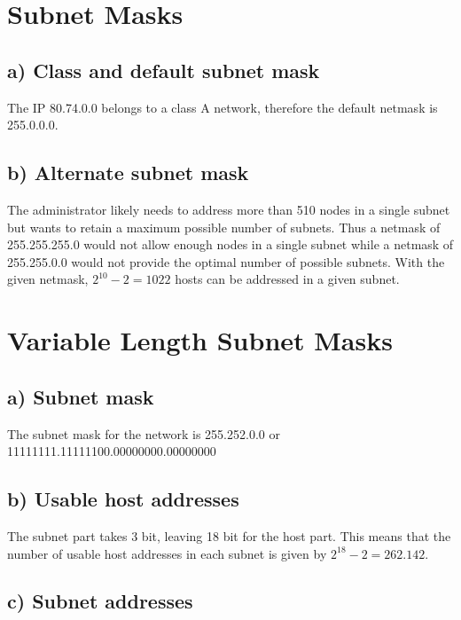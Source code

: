 \documentclass[a4paper, 11 pt, article, accentcolor=tud7b]{tudreport}
\begin{document}
	\section{Subnet Masks}
	
	\subsection*{a) Class and default subnet mask}
	The IP 80.74.0.0 belongs to a class A network, therefore the default netmask is 255.0.0.0.
	
	\subsection*{b) Alternate subnet mask}
	The administrator likely needs to address more than 510 nodes in a single subnet but wants to retain a maximum possible number of subnets. Thus a netmask of 255.255.255.0 would not allow enough nodes in a single subnet while a netmask of 255.255.0.0 would not provide the optimal number of possible subnets. With the given netmask, $2^{10} - 2 = 1022$ hosts can be addressed in a given subnet.
	
	\section{Variable Length Subnet Masks}
	
	\subsection*{a) Subnet mask}
	
	The subnet mask for the network is 255.252.0.0 or 11111111.11111100.00000000.00000000
	
	\subsection*{b) Usable host addresses}
	The subnet part takes 3 bit, leaving 18 bit for the host part. This means that the number of usable host addresses in each subnet is given by $2^{18} - 2 = 262.142$.
	
	\subsection*{c) Subnet addresses}
	
\end{document}
